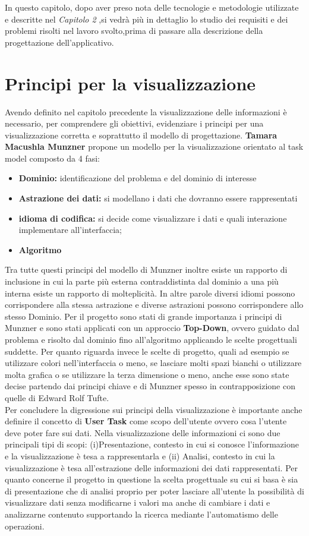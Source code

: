 \large{
In questo capitolo, dopo aver preso nota delle tecnologie e metodologie utilizzate e descritte nel \textit{Capitolo 2} ,si vedrà più in dettaglio lo studio dei requisiti e dei problemi risolti nel lavoro svolto,prima di passare alla descrizione della progettazione dell'applicativo.
\section{Principi per la visualizzazione} 
Avendo definito nel capitolo precedente la visualizzazione delle informazioni è necessario, per comprendere gli obiettivi, evidenziare i principi per una visualizzazione corretta e soprattutto il modello di progettazione.
\textbf{Tamara Macushla Munzner} propone un modello per la visualizzazione orientato al task model composto da 4 fasi:
\begin{itemize}
	\item \textbf{Dominio:} identificazione del problema e del dominio di interesse
	\item \textbf{Astrazione dei dati:} si modellano i dati che dovranno essere rappresentati
	\item \textbf{idioma di codifica:} si decide come visualizzare i dati e quali interazione implementare all'interfaccia;
	\item \textbf{Algoritmo}
\end{itemize}

Tra tutte questi principi del modello di Munzner inoltre esiste un rapporto di inclusione in cui la parte più esterna contraddistinta dal dominio a una più interna esiste un rapporto di molteplicità.
In altre parole diversi idiomi possono corrispondere alla stessa astrazione e diverse astrazioni possono corrispondere allo stesso Dominio.
Per il progetto sono stati di grande importanza i principi di Munzner e sono stati applicati con un approccio \textbf{Top-Down}, ovvero guidato dal problema e risolto dal dominio fino all'algoritmo applicando le scelte progettuali suddette.
Per quanto riguarda invece le scelte di progetto, quali ad esempio se utilizzare colori nell'interfaccia o meno, se lasciare molti spazi bianchi o utilizzare molta grafica o se utilizzare la terza dimensione o meno, anche esse sono state decise partendo dai principi chiave e di Munzner spesso in contrapposizione con quelle di Edward Rolf Tufte.\\
Per concludere la digressione sui principi della visualizzazione è importante anche definire il concetto di \textbf{User Task} come scopo dell'utente ovvero cosa l'utente deve poter fare sui dati.
Nella visualizzazione delle informazioni ci sono due principali tipi di scopi: (i)Presentazione, contesto in cui si conosce l'informazione e la visualizzazione è tesa a rappresentarla e (ii) Analisi, contesto in cui la visualizzazione è tesa all'estrazione delle informazioni dei dati rappresentati.
Per quanto concerne il progetto in questione la scelta progettuale su cui si basa è sia di presentazione che di analisi proprio per poter lasciare all'utente la possibilità di visualizzare dati senza modificarne i valori ma anche di cambiare i dati e analizzarne contenuto supportando la ricerca mediante l'automatismo delle operazioni.
}
